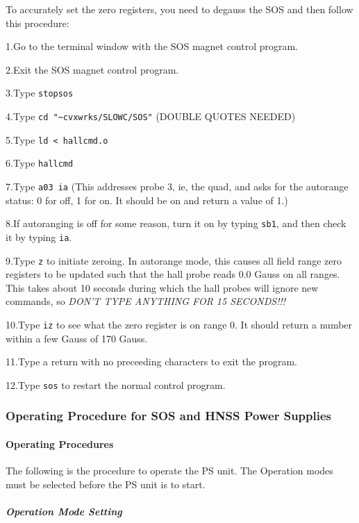 To accurately set the zero registers, you need to degauss the SOS
and then follow this procedure:
\begin{description}
\item{1.}Go to the terminal window with the SOS magnet control program.
\item{2.}Exit the SOS magnet control program.
\item{3.}Type \verb|stopsos|
\item{4.}Type \verb|cd "~cvxwrks/SLOWC/SOS"| (DOUBLE QUOTES NEEDED)
\item{5.}Type \verb|ld < hallcmd.o|
\item{6.}Type \verb|hallcmd|
\item{7.}Type \verb|a03 ia| (This addresses probe 3, ie, the quad, and asks for
     the autorange status: 0 for off, 1 for on. It should be on and
     return a value of 1.)
\item{8.}If autoranging is off for some reason,
     turn it on by typing \verb|sb1|, and then check it by typing \verb|ia|.
\item{9.}Type \verb|z| to initiate zeroing. In autorange mode, this causes
    all field range zero registers to be updated such that the
    hall probe reads 0.0 Gauss on all ranges. This takes about 10
    seconds during which the hall probes will ignore new commands,
    so {\em DON'T TYPE ANYTHING FOR 15 SECONDS!!!}
\item{10.}Type \verb|iz| to see what the zero register is on range 0. It should
    return a number within a few Gauss of 170 Gauss.
\item{11.}Type a return with no preceeding characters to exit the program.
\item{12.}Type \verb|sos| to restart the normal control program.
\end{description}

\subsubsection{Operating Procedure for SOS and HNSS Power Supplies}

\paragraph {Operating Procedures}

The following is the procedure to operate the PS unit.
The Operation modes must be selected before the PS unit is to
start.

\subparagraph {Operation Mode Setting}

